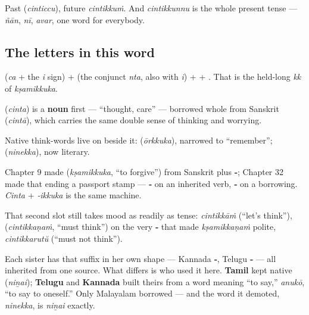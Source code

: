 Past \textbf{} (\emph{cinticcu}), future \emph{cintikkuṁ}. And \emph{cintikkunnu} is the whole present tense — \emph{ñān}, \emph{nī}, \emph{avar}, one word for everybody.

\subsection*{The letters in this word}
\textbf{} (\emph{ca} + the \emph{i} sign) + \textbf{} (the conjunct \textbf{} \emph{nta}, also with \emph{i}) + \textbf{} + \textbf{}. That \textbf{} is the held-long \emph{kk} of \emph{kṣamikkuka}.

\begin{cousinweb}
\textbf{} (\emph{cinta}) is a \textbf{noun} first — \textquotedblleft{}thought, care\textquotedblright{} — borrowed whole from Sanskrit \textbf{} (\emph{cintā}), which carries the same double sense of thinking and worrying.

Native think-words live on beside it: \textbf{} (\emph{ōrkkuka}), narrowed to \textquotedblleft{}remember\textquotedblright{}; \textbf{} (\emph{ninekka}), now literary.
\end{cousinweb}

\begin{grammarlens}[title={Grammar Lens: ‑\ml{ഇക്കുക}, the suffix that naturalises a loan}]
Chapter 9 made \textbf{} (\emph{kṣamikkuka}, \textquotedblleft{}to forgive\textquotedblright{}) from Sanskrit \textbf{} plus \textbf{‑}; Chapter 32 made that ending a passport stamp — \textbf{‑} on an inherited verb, \textbf{‑} on a borrowing. \emph{Cinta} + \emph{‑ikkuka} is the same machine.

That second slot still takes mood as readily as tense: \emph{cintikkāṁ} (\textquotedblleft{}let's think\textquotedblright{}), \textbf{} (\emph{cintikkaṇaṁ}, \textquotedblleft{}must think\textquotedblright{}) on the very \textbf{‑} that made \emph{kṣamikkaṇaṁ} polite, \emph{cintikkarutŭ} (\textquotedblleft{}must not think\textquotedblright{}).

Each sister has that suffix in her own shape — Kannada \textbf{‑}, Telugu \textbf{‑} — all inherited from one source. What differs is who used it here. \textbf{Tamil} kept native \textbf{} (\emph{niṉai}); \textbf{Telugu} and \textbf{Kannada} built theirs from a word meaning \textquotedblleft{}to say,\textquotedblright{} \emph{anukō}, \textquotedblleft{}to say to oneself.\textquotedblright{} Only Malayalam borrowed — and the word it demoted, \emph{ninekka}, is \emph{niṉai} exactly.
\end{grammarlens}

